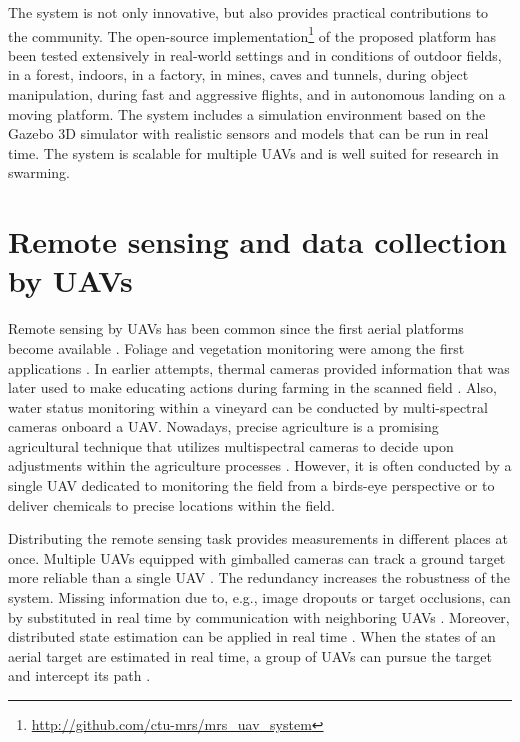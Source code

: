 \documentclass[a4paper,11pt,titlepage,twoside]{book}
\begin{document}
The system is not only innovative, but also provides practical contributions to the community.
The open-source implementation\footnote{\url{http://github.com/ctu-mrs/mrs_uav_system}} of the proposed platform has been tested extensively in real-world settings and in conditions of outdoor fields, in a forest, indoors, in a factory, in mines, caves and tunnels, during object manipulation, during fast and aggressive flights, and in autonomous landing on a moving platform.
The system includes a simulation environment based on the Gazebo 3D simulator with realistic sensors and models that can be run in real time.
The system is scalable for multiple \acp{UAV} and is well suited for research in swarming.



\section{Remote sensing and data collection by UAVs}

Remote sensing by \acp{UAV} has been common since the first aerial platforms become available \cite{colomina2014unmanned, pajares2015overview}.
Foliage and vegetation monitoring were among the first applications \cite{barrientos2011aerial}.
In earlier attempts, thermal cameras provided information that was later used to make educating actions during farming in the scanned field \cite{berni2009thermal} .
Also, water status monitoring within a vineyard \cite{baluja2012assessment} can be conducted by multi-spectral cameras onboard a \ac{UAV}.
Nowadays, precise agriculture is a promising agricultural technique that utilizes multispectral cameras to decide upon adjustments within the agriculture processes \cite{fu2020wheat, zha2020improving, jang2020cost}.
However, it is often conducted by a single \ac{UAV} dedicated to monitoring the field from a birds-eye perspective or to deliver chemicals to precise locations within the field.

Distributing the remote sensing task provides measurements in different places at once.
Multiple UAVs equipped with gimballed cameras can track a ground target more reliable than a single \ac{UAV} \cite{sun2014distributed}.
The redundancy increases the robustness of the system.
Missing information due to, e.g., image dropouts or target occlusions, can by substituted in real time by communication with neighboring \acp{UAV} \cite{baek2020optimal, farmani2015tracking}.
Moreover, distributed state estimation can be applied in real time \cite{capitan2009delayed, merino2007multi, wan2000unscented}.
When the states of an aerial target are estimated in real time, a group of \acp{UAV} can pursue the target and intercept its path \cite{zhu2017distributed}.
\end{document}
